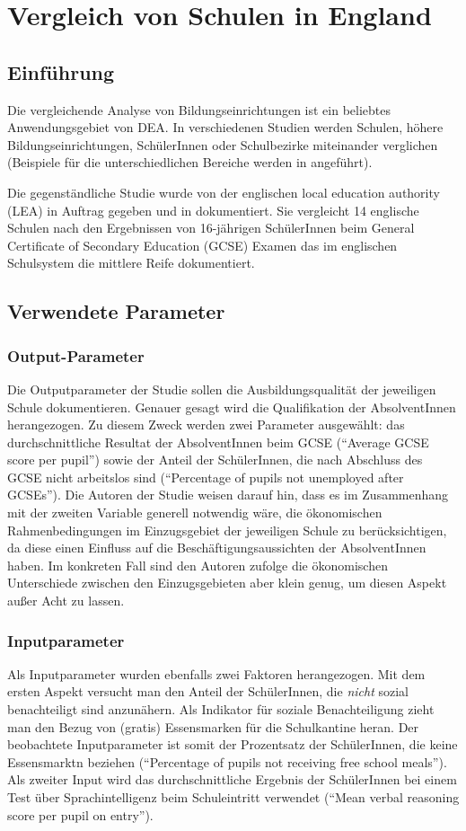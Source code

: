 \section{Vergleich von Schulen in England}
\subsection{Einführung}
Die vergleichende Analyse von Bildungseinrichtungen ist ein beliebtes Anwendungsgebiet von DEA.
In verschiedenen Studien werden Schulen, höhere Bildungseinrichtungen, SchülerInnen oder Schulbezirke miteinander verglichen (Beispiele für die unterschiedlichen Bereiche werden in \cite*[S.77]{fried_measurement_2008} angeführt).

Die gegenständliche Studie wurde von der englischen local education authority (LEA) in Auftrag gegeben und in \cite{thanassoulis_guiding_1994} dokumentiert.
Sie vergleicht 14 englische Schulen nach den Ergebnissen von 16-jährigen SchülerInnen beim General Certificate of Secondary Education (GCSE) Examen das im englischen Schulsystem die mittlere Reife dokumentiert.

\subsection{Verwendete Parameter}
\subsubsection{Output-Parameter}
Die Outputparameter der Studie sollen die Ausbildungsqualität der jeweiligen Schule dokumentieren.
Genauer gesagt wird die Qualifikation der AbsolventInnen herangezogen.
Zu diesem Zweck werden zwei Parameter ausgewählt: das durchschnittliche Resultat der AbsolventInnen beim GCSE ("`Average GCSE score per pupil"') sowie der Anteil der SchülerInnen, die nach Abschluss des GCSE nicht arbeitslos sind ("`Percentage of pupils not unemployed after GCSEs"').
Die Autoren der Studie weisen darauf hin, dass es im Zusammenhang mit der zweiten Variable generell notwendig wäre, die ökonomischen Rahmenbedingungen im Einzugsgebiet der jeweiligen Schule zu berücksichtigen, da diese einen Einfluss auf die Beschäftigungsaussichten der AbsolventInnen haben.
Im konkreten Fall sind den Autoren zufolge die ökonomischen Unterschiede zwischen den Einzugsgebieten aber klein genug, um diesen Aspekt außer Acht zu lassen.

\subsubsection{Inputparameter}
Als Inputparameter wurden ebenfalls zwei Faktoren herangezogen.
Mit dem ersten Aspekt versucht man den Anteil der SchülerInnen, die \emph{nicht} sozial benachteiligt sind anzunähern.
Als Indikator für soziale Benachteiligung zieht man den Bezug von (gratis) Essensmarken für die Schulkantine heran. Der beobachtete Inputparameter ist somit der Prozentsatz der SchülerInnen, die keine Essensmarktn beziehen ("`Percentage of pupils not receiving free school meals"').
Als zweiter Input wird das durchschnittliche Ergebnis der SchülerInnen bei einem Test über Sprachintelligenz beim Schuleintritt verwendet ("`Mean verbal reasoning score per pupil on entry"').

